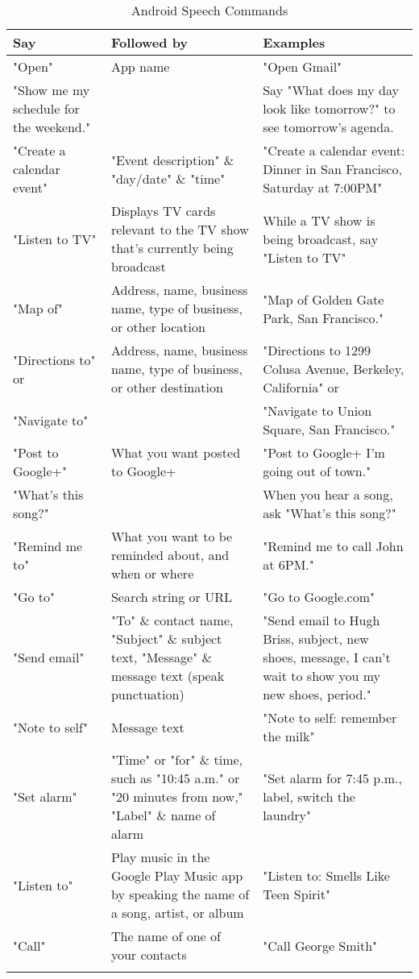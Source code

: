 \begin{table}[htbp]
  \centering
  \caption{Android Speech Commands}
  \label{tab:asc}
 \renewcommand{\arraystretch}{1.2}
    \begin{tabularx}{\textwidth}{p{3cm}XX}
    \toprule
    \textbf{Say} & \textbf{Followed by} & \textbf{Examples} \\
    \midrule
    "Open" & App name & "Open Gmail" \\ \hline
   "Show me my schedule for the weekend." &       & Say "What does my day look like tomorrow?" to see tomorrow's agenda. \\ \hline
    "Create a calendar event" & "Event description" \& "day/date" \& "time" & "Create a calendar event: Dinner in San Francisco, Saturday at 7:00PM" \\ \hline
    "Listen to TV" & Displays TV cards relevant to the TV show that's currently being broadcast & While a TV show is being broadcast, say "Listen to TV" \\ \hline
    "Map of" & Address, name, business name, type of business, or other location & "Map of Golden Gate Park, San Francisco." \\ \hline
    "Directions to" or & Address, name, business name, type of business, or other destination & "Directions to 1299 Colusa Avenue, Berkeley, California" or \\ \hline
    "Navigate to" &       & "Navigate to Union Square, San Francisco." \\ \hline
    "Post to Google+" & What you want posted to Google+ & "Post to Google+ I'm going out of town." \\ \hline
    "What's this song?" &       & When you hear a song, ask "What's this song?" \\ \hline
    "Remind me to" & What you want to be reminded about, and when or where & "Remind me to call John at 6PM." \\ \hline
    "Go to" & Search string or URL & "Go to Google.com" \\ \hline
    "Send email" & "To" \& contact name, "Subject" \& subject text, "Message" \& message text (speak punctuation)  & "Send email to Hugh Briss, subject, new shoes, message, I can’t wait to show you my new shoes, period." \\ \hline
    "Note to self" & Message text & "Note to self: remember the milk" \\ \hline
    "Set alarm" & "Time" or "for" \& time, such as "10:45 a.m." or "20 minutes from now," "Label" \& name of alarm & "Set alarm for 7:45 p.m., label, switch the laundry" \\ \hline
    "Listen to" & Play music in the Google Play Music app by speaking the name of a song, artist, or album & "Listen to: Smells Like Teen Spirit" \\ \hline
    "Call" & The name of one of your contacts & "Call George Smith" \\
    \bottomrule
    \label{tab:asc2}
    \end{tabularx}%
\end{table}%

